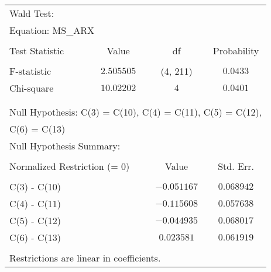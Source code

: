 \begin{tabular}{lrrr}
\multicolumn{1}{l}{Wald Test:}&\multicolumn{1}{c}{}&\multicolumn{1}{c}{}&\multicolumn{1}{c}{}\\
\multicolumn{2}{l}{Equation: MS\_ARX}&\multicolumn{1}{c}{}&\multicolumn{1}{c}{}\\
[4.5pt] \hline \\ [-4.5pt]
\multicolumn{1}{l}{Test Statistic}&\multicolumn{1}{c}{Value}&\multicolumn{1}{c}{df}&\multicolumn{1}{c}{Probability}\\
[4.5pt] \hline \\ [-4.5pt]
\multicolumn{1}{l}{F-statistic}&\multicolumn{1}{c}{$2.505505$}&\multicolumn{1}{c}{(4, 211)}&\multicolumn{1}{c}{$0.0433$}\\
\multicolumn{1}{l}{Chi-square}&\multicolumn{1}{c}{$10.02202$}&\multicolumn{1}{c}{$4$}&\multicolumn{1}{c}{$0.0401$}\\
[4.5pt] \hline \\ [-4.5pt]
\multicolumn{1}{c}{}&\multicolumn{1}{c}{}&\multicolumn{1}{c}{}&\multicolumn{1}{c}{}\\
\multicolumn{5}{l}{Null Hypothesis: C(3) = C(10), C(4) = C(11), C(5) = C(12),}\\
\multicolumn{2}{l}{C(6) = C(13)}&\multicolumn{1}{c}{}&\multicolumn{1}{c}{}\\
\multicolumn{2}{l}{Null Hypothesis Summary:}&\multicolumn{1}{c}{}&\multicolumn{1}{c}{}\\
[4.5pt] \hline \\ [-4.5pt]
\multicolumn{2}{l}{Normalized Restriction (= 0)}&\multicolumn{1}{c}{Value}&\multicolumn{1}{c}{Std. Err.}\\
[4.5pt] \hline \\ [-4.5pt]
\multicolumn{1}{l}{C(3) - C(10)}&\multicolumn{1}{c}{}&\multicolumn{1}{c}{$-0.051167$}&\multicolumn{1}{c}{$0.068942$}\\
\multicolumn{1}{l}{C(4) - C(11)}&\multicolumn{1}{c}{}&\multicolumn{1}{c}{$-0.115608$}&\multicolumn{1}{c}{$0.057638$}\\
\multicolumn{1}{l}{C(5) - C(12)}&\multicolumn{1}{c}{}&\multicolumn{1}{c}{$-0.044935$}&\multicolumn{1}{c}{$0.068017$}\\
\multicolumn{1}{l}{C(6) - C(13)}&\multicolumn{1}{c}{}&\multicolumn{1}{c}{$0.023581$}&\multicolumn{1}{c}{$0.061919$}\\
[4.5pt] \hline \\ [-4.5pt]
\multicolumn{3}{l}{Restrictions are linear in coefficients.}&\multicolumn{1}{c}{}\\
\end{tabular}